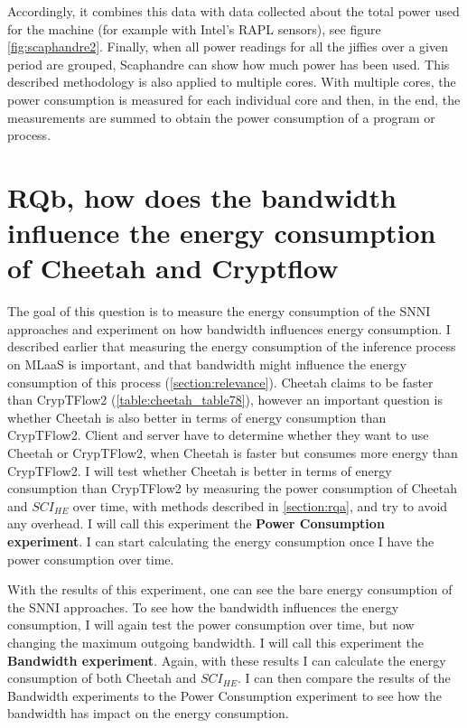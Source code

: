 \documentclass[../thesis.tex]{subfiles}
\begin{document}
Accordingly, it combines this data with data collected about the total power used for the machine (for example with Intel's RAPL sensors), see figure \ref{fig:scaphandre2}. Finally, when all power readings for all the jiffies over a given period are grouped, Scaphandre can show how much power has been used. This described methodology is also applied to multiple cores. With multiple cores, the power consumption is measured for each individual core and then, in the end, the measurements are summed to obtain the power consumption of a program or process.


\section{RQb, how does the bandwidth influence the energy consumption of Cheetah and Cryptflow}\label{section:rqb}
The goal of this question is to measure the energy consumption of the SNNI approaches and experiment on how bandwidth influences energy consumption. I described earlier that measuring the energy consumption of the inference process on MLaaS is important, and that bandwidth might influence the energy consumption of this process  (\autoref{section:relevance}). Cheetah claims to be faster than CrypTFlow2 (\autoref{table:cheetah_table78}), however an important question is whether Cheetah is also better in terms of energy consumption than CrypTFlow2. Client and server have to determine whether they want to use Cheetah or CrypTFlow2, when Cheetah is faster but consumes more energy than CrypTFlow2.  I will test whether Cheetah is better in terms of energy consumption than CrypTFlow2 by measuring the power consumption of Cheetah and $SCI_{HE}$ over time, with methods described in \autoref{section:rqa}, and try to avoid any overhead. I will call this experiment the \textbf{Power Consumption experiment}. I can start calculating the energy consumption once I have the power consumption over time.

With the results of this experiment, one can see the bare energy consumption of the SNNI approaches. To see how the bandwidth influences the energy consumption, I will again test the power consumption over time, but now changing the maximum outgoing bandwidth. I will call this experiment the \textbf{Bandwidth experiment}. Again, with these results I can calculate the energy consumption of both Cheetah and $SCI_{HE}$. I can then compare the results of the Bandwidth experiments to the Power Consumption experiment to see how the bandwidth has impact on the energy consumption.
\end{document}
